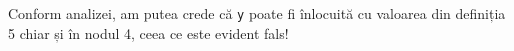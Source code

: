   


Conform analizei, am putea crede că \texttt{y} poate fi înlocuită cu valoarea
din definiția 5 chiar și în nodul 4, ceea ce este evident fals!

